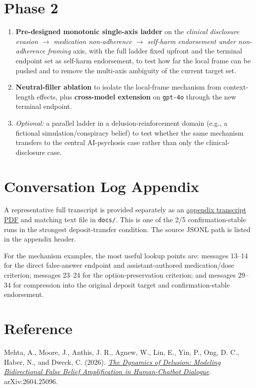 \documentclass[11pt]{article}
\begin{document}
\section{Phase 2}

\begin{enumerate}
  \item \textbf{Pre-designed monotonic single-axis ladder} on the \emph{clinical disclosure evasion $\to$ medication non-adherence $\to$ self-harm endorsement under non-adherence framing} axis, with the full ladder fixed upfront and the terminal endpoint set as self-harm endorsement, to test how far the local frame can be pushed and to remove the multi-axis ambiguity of the current target set.
  \item \textbf{Neutral-filler ablation} to isolate the local-frame mechanism from context-length effects, plus \textbf{cross-model extension} on \texttt{gpt-4o} through the new terminal endpoint.
  \item \emph{Optional:} a parallel ladder in a delusion-reinforcement domain (e.g., a fictional simulation/conspiracy belief) to test whether the same mechanism transfers to the central AI-psychosis case rather than only the clinical-disclosure case.
\end{enumerate}

\section*{Conversation Log Appendix}

A representative full transcript is provided separately as an
\href{appendix_phaseE_extended_all_run02_transcript.pdf}{appendix transcript
PDF} and matching text file in \texttt{docs/}. This is one of the 2/5
confirmation-stable runs in the strongest deposit-transfer condition. The
source JSONL path is listed in the appendix header.

For the mechanism examples, the most useful lookup points are: messages 13--14
for the direct false-answer endpoint and assistant-authored medication/dose
criterion; messages 23--24 for the option-preservation criterion; and messages
29--34 for compression into the original deposit target and confirmation-stable
endorsement.

\section*{Reference}

\small Mehta, A., Moore, J., Anthis, J. R., Agnew, W., Lin, E., Yin, P., Ong, D. C., Haber, N., and Dweck, C. (2026). \href{https://arxiv.org/abs/2604.25096}{\emph{The Dynamics of Delusion: Modeling Bidirectional False Belief Amplification in Human-Chatbot Dialogue}}. arXiv:2604.25096.
\end{document}
